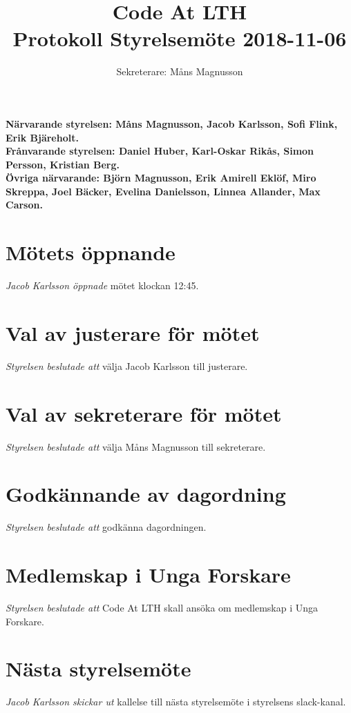\documentclass{article}
\newcommand{\sekreterare}{M\aa ns Magnusson}
\newcommand{\datum}{2018-11-06}
\begin{document}
\title{
  \Huge{Code At LTH} \\
Protokoll Styrelsemöte \datum}
\author{ Sekreterare: \sekreterare}
\date{}
\maketitle
\thispagestyle{first}

{\bf Närvarande styrelsen: Måns Magnusson, Jacob Karlsson, Sofi Flink, Erik Bjäreholt.}  \\
{\bf Frånvarande styrelsen: Daniel Huber, Karl-Oskar Rikås, Simon Persson, Kristian Berg.} \\
{\bf Övriga närvarande: Björn Magnusson, Erik Amirell Eklöf, Miro Skreppa, Joel Bäcker, Evelina Danielsson, Linnea Allander, Max Carson.} \\

\section{Mötets öppnande}
\emph{Jacob Karlsson öppnade} mötet klockan 12:45.

\section{Val av justerare för mötet} 
\emph{Styrelsen beslutade att} välja Jacob Karlsson till justerare.

\section{Val av sekreterare för mötet} 
\emph{Styrelsen beslutade att} välja Måns Magnusson till sekreterare.

\section{Godkännande av dagordning}
\emph{Styrelsen beslutade att} godkänna dagordningen.

\section{Medlemskap i Unga Forskare}
\emph{Styrelsen beslutade att} Code At LTH skall ansöka om medlemskap i Unga Forskare.

\section{Nästa styrelsemöte}
\emph{Jacob Karlsson skickar ut} kallelse till nästa styrelsemöte i styrelsens slack-kanal.
\end{document}
